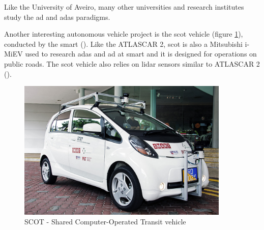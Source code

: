 Like the University of Aveiro, many other universities and research institutes study the \gls{ad} and \gls{adas} paradigms.

Another interesting autonomous vehicle project is the \gls{scot} vehicle (figure \ref{fig:scot}), conducted by the \gls{smart} (\cite{Singapore-MITAllianceforResearchandTechnology}). Like the ATLASCAR 2, \gls{scot} is also a Mitsubishi i-MiEV used to research \gls{adas} and \gls{ad} at \gls{smart} and it is designed for operations on public roads. The \gls{scot} vehicle also relies on \gls{lidar} sensors similar to ATLASCAR 2 (\cite{Teo}). 

\begin{figure}[htp]
	
	\centering
	\includegraphics[width=0.9\textwidth]{capstate/imgs/scot}
	
	\caption{SCOT - Shared Computer-Operated Transit vehicle}
	\label{fig:scot}
	
\end{figure}

